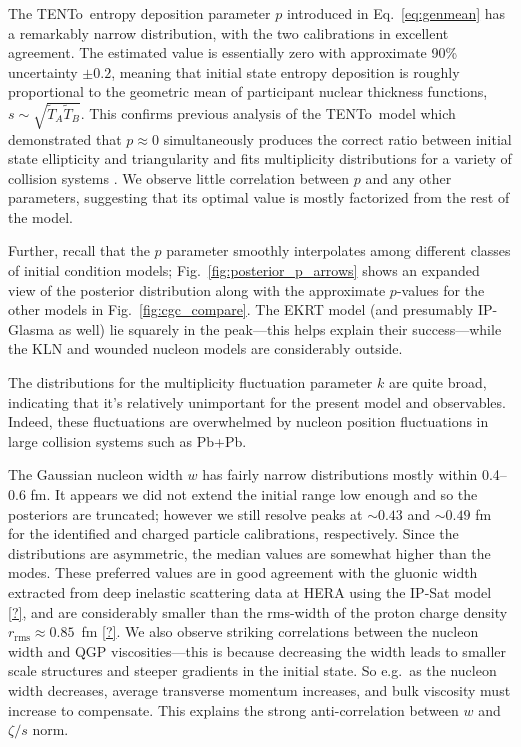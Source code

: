 \documentclass[aps,prc,reprint,amsmath,nofootinbib,superscriptaddress]{revtex4-1}
\newcommand{\trento}{T\raisebox{-0.5ex}{R}ENTo}
\newcommand{\T}{\tilde{T}}
\begin{document}
The \trento\ entropy deposition parameter $p$ introduced in Eq.~\eqref{eq:genmean} has a remarkably narrow distribution, with the two calibrations in excellent agreement.
The estimated value is essentially zero with approximate 90\% uncertainty $\pm0.2$, meaning that initial state entropy deposition is roughly proportional to the geometric mean of participant nuclear thickness functions, $s \sim \sqrt{\T_A\T_B}$.
This confirms previous analysis of the \trento\ model which demonstrated that $p \approx 0$ simultaneously produces the correct ratio between initial state ellipticity and triangularity and fits multiplicity distributions for a variety of collision systems \cite{Moreland:2014oya}.
We observe little correlation between $p$ and any other parameters, suggesting that its optimal value is mostly factorized from the rest of the model.

Further, recall that the $p$ parameter smoothly interpolates among different classes of initial condition models;
Fig.~\ref{fig:posterior_p_arrows} shows an expanded view of the posterior distribution along with the approximate $p$-values for the other models in Fig.~\ref{fig:cgc_compare}.
The EKRT model (and presumably IP-Glasma as well) lie squarely in the peak---this helps explain their success---while the KLN and wounded nucleon models are considerably outside.

The distributions for the multiplicity fluctuation parameter $k$ are quite broad, indicating that it's relatively unimportant for the present model and observables.
Indeed, these fluctuations are overwhelmed by nucleon position fluctuations in large collision systems such as Pb+Pb.

The Gaussian nucleon width $w$ has fairly narrow distributions mostly within 0.4--0.6 fm.
It appears we did not extend the initial range low enough and so the posteriors are truncated;
however we still resolve peaks at ${\sim}0.43$ and ${\sim}0.49$ fm for the identified and charged particle calibrations, respectively.
Since the distributions are asymmetric, the median values are somewhat higher than the modes.
These preferred values are in good agreement with the gluonic width extracted from deep inelastic scattering data at HERA using the IP-Sat model \ref{?}, and are considerably smaller than the rms-width of the proton charge density $r_\text{rms} \approx 0.85$~fm \ref{?}.
We also observe striking correlations between the nucleon width and QGP viscosities---this is because decreasing the width leads to smaller scale structures and steeper gradients in the initial state.
So e.g.\ as the nucleon width decreases, average transverse momentum increases, and bulk viscosity must increase to compensate.
This explains the strong anti-correlation between $w$ and $\zeta/s$ norm.
\end{document}
